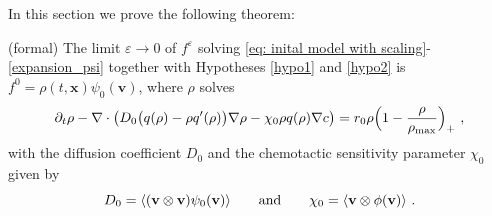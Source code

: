 \documentclass[review,onefignum,onetabnum]{siamart220329}
\begin{document}
In this section we prove the following theorem:
\begin{theorem}{}\label{theorem1}(formal)
The limit $\varepsilon \rightarrow 0$ of $f^\varepsilon$ solving \cref{eq: inital model with scaling}-\cref{expansion_psi} together with Hypotheses \cref{hypo1} and \cref{hypo2} is $f^0 = \rho(t,\mathbf{x})\psi_0(\mathbf{v})$, where $\rho$ solves
\begin{equation}
    \partial_t\rho-\nabla\cdot\left(D_0\big(q(\rho)-\rho q'(\rho) \big)\nabla \rho-\chi_0\rho q(\rho)\nabla c \right)={r_0\rho\Bigl(1-\frac{\rho}{\rho_{\textnormal{max}}} \Bigr)_+}\ ,\label{eq: macroscopic equation1}
\end{equation}
with the diffusion coefficient $D_0$ and the chemotactic sensitivity parameter $\chi_0$ given by
\begin{equation}D_0=\langle(\mathbf{v}\otimes \mathbf{v})\psi_0(\mathbf{v})\rangle\qquad \textnormal{and}\qquad \chi_0=\langle\mathbf{v}\otimes\phi(\mathbf{v})\rangle\ . \label{eq: macroscopic coefficients}
\end{equation}
\end{theorem}
\end{document}
